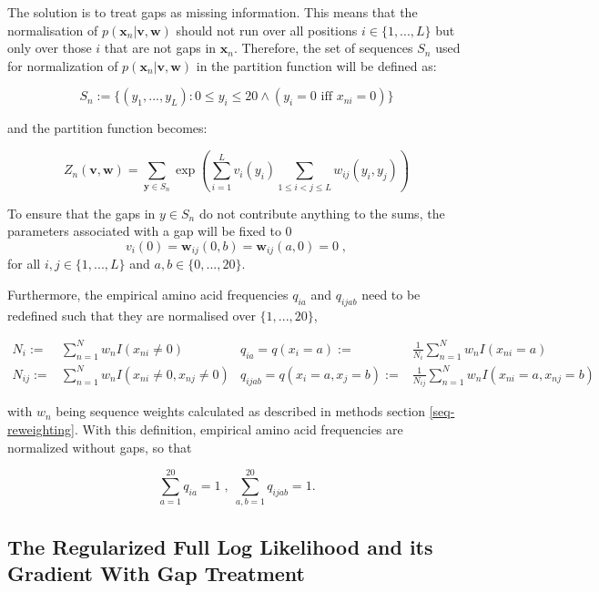 \documentclass[11pt,a4paper,twoside]{book}
\newcommand{\eq}{\!=\!}
\newcommand{\seq}{\mathbf{x}}
\newcommand{\Sn}{S_n}
\renewcommand{\v}{\mathbf{v}}
\newcommand{\vi}{v_{i}}
\newcommand{\w}{\mathbf{w}}
\newcommand{\wij}{\mathbf{w}_{ij}}
\theoremstyle{definition}
\theoremstyle{definition}
\theoremstyle{remark}
\begin{document}
The solution is to treat gaps as missing information. This means that
the normalisation of \(p(\seq_n | \v, \w)\) should not run over all
positions \(i \in \{1,... , L\}\) but only over those \(i\) that are not
gaps in \(\seq_n\). Therefore, the set of sequences \(\Sn\) used for
normalization of \(p(\seq_n | \v, \w)\) in the partition function will
be defined as:

\begin{equation}
\Sn := \{(y_1,... , y_L): 0 \leq y_i \leq 20 \land (y_i \eq 0 \textrm{ iff } x_{ni} \eq 0) \}
\end{equation}

and the partition function becomes:

\begin{equation}
  Z_n(\v, \w) = \sum_{\mathbf{y} \in \Sn} \exp \left( \sum_{i=1}^L v_i(y_i) \sum_{1 \leq i < j \leq L} w_{ij}(y_i, y_j)  \right)
\end{equation}

To ensure that the gaps in \(y \in \Sn\) do not contribute anything to
the sums, the parameters associated with a gap will be fixed to 0 \[
\vi(0) = \wij(0, b) = \wij(a, 0) = 0 \; ,
\] for all \(i, j \in \{1, ..., L\}\) and \(a, b \in \{0, ..., 20\}\).

Furthermore, the empirical amino acid frequencies \(q_{ia}\) and
\(q_{ijab}\) need to be redefined such that they are normalised over
\(\{1, ..., 20\}\),

\begin{align}
   N_i :=& \sum_{n=1}^N  w_n I(x_{ni} \!\ne\! 0) &  q_{ia} = q(x_i \eq a) :=& \frac{1}{N_i} \sum_{n=1}^N w_n I(x_{ni} \eq a)   \\
   N_{ij} :=& \sum_{n=1}^N  w_n I(x_{ni} \!\ne\! 0, x_{nj} \!\ne\! 0)  &  q_{ijab} = q(x_i \eq a, x_j \eq b) :=& \frac{1}{N_{ij}} \sum_{n=1}^N w_n I(x_{ni} \eq a, x_{nj} \eq b)
\end{align}

with \(w_n\) being sequence weights calculated as described in methods
section \ref{seq-reweighting}. With this definition, empirical amino
acid frequencies are normalized without gaps, so that

\begin{equation}
    \sum_{a=1}^{20} q_{ia} = 1      \; , \;     \sum_{a,b=1}^{20} q_{ijab} = 1.
\label{eq:normalized-emp-freq}
\end{equation}

\subsection{The Regularized Full Log Likelihood and its Gradient With
Gap
Treatment}\label{the-regularized-full-log-likelihood-and-its-gradient-with-gap-treatment}
\end{document}
